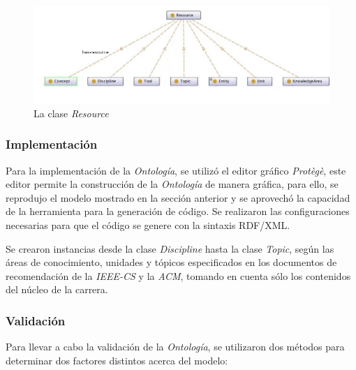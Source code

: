 \begin{itemize}
\newpage
\begin{figure}[!h]
    \begin{center}
        \includegraphics[scale=0.5]{images/onto_resource_class.jpg}
        \caption{La clase \textit{Resource}}
        \label{resourceClass}
    \end{center}
\end{figure}

\subsubsection{Implementación}
Para la implementación de la \textit{Ontología}, se utilizó el editor gráfico \textit{Protègè}, este editor permite la construcción de la \textit{Ontología} de manera gráfica, para ello, se reprodujo el modelo mostrado en la sección anterior y se aprovechó la capacidad de la herramienta para la generación de código. Se realizaron las configuraciones necesarias para que el código se genere con la sintaxis RDF/XML.

Se crearon instancias desde la clase \textit{Discipline} hasta la clase \textit{Topic}, según las áreas de conocimiento, unidades y tópicos especificados en los documentos de recomendación de la \textit{IEEE-CS} y la \textit{ACM}, tomando en cuenta sólo los contenidos del núcleo de la carrera.

\subsubsection{Validación}
Para llevar a cabo la validación de la \textit{Ontología}, se utilizaron dos métodos para determinar dos factores distintos acerca del modelo: 


\end{itemize}
